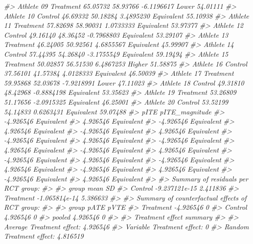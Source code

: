 \documentclass[
]{book}
\newenvironment{Shaded}{\begin{snugshade}}{\end{snugshade}}
\newcommand{\CommentTok}[1]{\textcolor[rgb]{0.56,0.35,0.01}{\textit{#1}}}
\begin{document}
\begin{Shaded}
\begin{Highlighting}[]
\CommentTok{\#>  Athlete 09 Treatment 65.05732  58.93766 {-}6.1196617      Lower       54.01111}
\CommentTok{\#>  Athlete 10   Control 46.69332  50.18284  3.4895230 Equivalent       55.10938}
\CommentTok{\#>  Athlete 11 Treatment 57.82698  58.90031  1.0733333 Equivalent       53.97377}
\CommentTok{\#>  Athlete 12   Control 49.16140  48.36452 {-}0.7968803 Equivalent       53.29107}
\CommentTok{\#>  Athlete 13 Treatment 46.24005  50.92561  4.6855567 Equivalent       45.99907}
\CommentTok{\#>  Athlete 14   Control 57.44395  54.26840 {-}3.1755549 Equivalent       59.19494}
\CommentTok{\#>  Athlete 15 Treatment 50.02857  56.51530  6.4867253     Higher       51.58875}
\CommentTok{\#>  Athlete 16   Control 37.56101  41.57384  4.0128333 Equivalent       46.50039}
\CommentTok{\#>  Athlete 17 Treatment 59.95868  52.03678 {-}7.9218991      Lower       47.11023}
\CommentTok{\#>  Athlete 18   Control 49.31810  48.42968 {-}0.8884198 Equivalent       53.35623}
\CommentTok{\#>  Athlete 19 Treatment 53.26809  51.17656 {-}2.0915325 Equivalent       46.25001}
\CommentTok{\#>  Athlete 20   Control 53.52199  54.14833  0.6263431 Equivalent       59.07488}
\CommentTok{\#>       pITE pITE\_magnitude}
\CommentTok{\#>  {-}4.926546     Equivalent}
\CommentTok{\#>   4.926546     Equivalent}
\CommentTok{\#>  {-}4.926546     Equivalent}
\CommentTok{\#>   4.926546     Equivalent}
\CommentTok{\#>  {-}4.926546     Equivalent}
\CommentTok{\#>   4.926546     Equivalent}
\CommentTok{\#>  {-}4.926546     Equivalent}
\CommentTok{\#>   4.926546     Equivalent}
\CommentTok{\#>  {-}4.926546     Equivalent}
\CommentTok{\#>   4.926546     Equivalent}
\CommentTok{\#>  {-}4.926546     Equivalent}
\CommentTok{\#>   4.926546     Equivalent}
\CommentTok{\#>  {-}4.926546     Equivalent}
\CommentTok{\#>   4.926546     Equivalent}
\CommentTok{\#>  {-}4.926546     Equivalent}
\CommentTok{\#>   4.926546     Equivalent}
\CommentTok{\#>  {-}4.926546     Equivalent}
\CommentTok{\#>   4.926546     Equivalent}
\CommentTok{\#>  {-}4.926546     Equivalent}
\CommentTok{\#>   4.926546     Equivalent}
\CommentTok{\#> }
\CommentTok{\#> Summary of residuals per RCT group:}
\CommentTok{\#> }
\CommentTok{\#>      group          mean       SD}
\CommentTok{\#>    Control {-}9.237121e{-}15 2.411836}
\CommentTok{\#>  Treatment {-}1.065814e{-}14 5.386633}
\CommentTok{\#> }
\CommentTok{\#> Summary of counterfactual effects of RCT group:}
\CommentTok{\#> }
\CommentTok{\#>      group      pATE pVTE}
\CommentTok{\#>  Treatment {-}4.926546    0}
\CommentTok{\#>    Control  4.926546    0}
\CommentTok{\#>     pooled  4.926546    0}
\CommentTok{\#> }
\CommentTok{\#> Treatment effect summary}
\CommentTok{\#> }
\CommentTok{\#> Average Treatment effect:  4.926546}
\CommentTok{\#> Variable Treatment effect:  0}
\CommentTok{\#> Random Treatment effect:  4.816519}
\end{Highlighting}
\end{Shaded}
\end{document}
